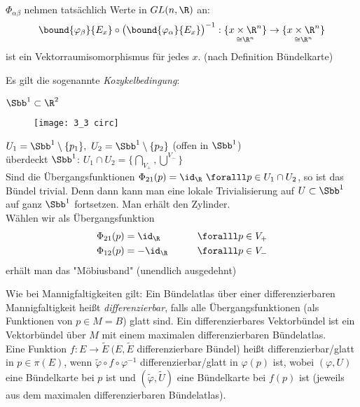 \begin{rem*}
	$\Phi_{\alpha \beta}$ nehmen tatsächlich Werte in $GL(n,\R)$ an:
	$$ \bound{\varphi_\beta}{E_x} \circ \big( \bound{\varphi_\alpha}{E_x} \big)^{-1}: \underset{\cong \R^n}{\{x \times \R^n\}} \to \underset{\cong \R^n}{\{x \times \R^n\}} $$
	ist ein Vektorraumisomorphismus für jedes $x$. (nach Definition Bündelkarte)
\end{rem*}

\begin{rem*}
	Es gilt die sogenannte \emph{Kozykelbedingung}:
\end{rem*}

\begin{exmp*}
	$ \Sbb^1 \subset \R^2 $\\
	\begin{minipage}{\linewidth}
		\begin{wrapfigure}{R}{4cm}
			\centering
			\texttt{[image: 3\_3 circ]}
		\end{wrapfigure}
		$ U_1 = \Sbb^1 \setminus \{p_1\},\ U_2 = \Sbb^1 \setminus \{p_2\} $ (offen in $\Sbb^1$)\\
		überdeckt $\Sbb^1$: $ U_1 \cap U_2 = \bigg\{ \underset{V_+}{\bigcap}, \overset{V_-}{\bigcup} \bigg\} $\\
		Sind die Übergangsfunktionen $ \Phi_{21}(p) = \id_\R\ \foralll p \in U_1 \cap U_2 $, so ist das Bündel trivial. Denn dann kann man eine lokale Trivialisierung auf $ U \subset \Sbb^1 $ auf ganz $\Sbb^1$ fortsetzen. Man erhält den Zylinder.\\
		Wählen wir als Übergangsfunktion
		\begin{alignat*}{2}
			\Phi_{21}(p) &= \id_\R \qquad &&\foralll p \in V_+\\
			\Phi_{12}(p) &= -\id_\R \qquad &&\foralll p \in V_-
		\end{alignat*}
		erhält man das "Möbiusband" (unendlich ausgedehnt)
	\end{minipage}
\end{exmp*}

\begin{defn*}
	Wie bei Mannigfaltigkeiten gilt: Ein Bündelatlas über einer differenzierbaren Mannigfaltigkeit heißt \emph{differenzierbar}, falls alle Übergangsfunktionen (als Funktionen von $p \in M = B$) glatt sind. Ein differenzierbares Vektorbündel ist ein Vektorbündel über $M$ mit einem maximalen differenzierbaren Bündelatlas.\\
	Eine Funktion $ f: E \to \tilde{E}\ (E,\tilde{E}$ differenzierbare Bündel) heißt differenzierbar/glatt in $p \in \pi(E)$, wenn $ \tilde{\varphi} \circ f \circ \varphi^{-1} $ differenzierbar/glatt in $\varphi(p)$ ist, wobei $(\varphi,U)$ eine Bündelkarte bei $p$ ist und $(\tilde{\varphi},\tilde{U})$ eine Bündelkarte bei $f(p)$ ist (jeweils aus dem maximalen differenzierbaren Bündelatlas). 
\end{defn*}

